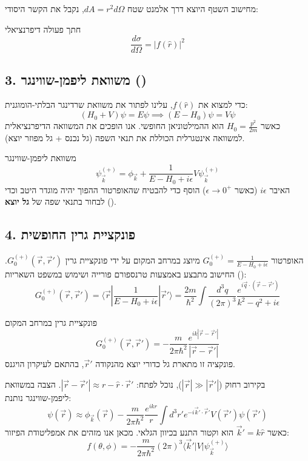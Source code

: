 מחישוב השטף היוצא דרך אלמנט שטח $dA = r^2 d\Omega$, נקבל את הקשר היסודי:
\begin{resultbox}{חתך פעולה דיפרנציאלי}
$$\frac{d\sigma}{d\Omega} = |f(\hat{r})|^2$$
\end{resultbox}

\subsection*{3. משוואת ליפמן-שווינגר ()}
כדי למצוא את $f(\hat{r})$, עלינו לפתור את משוואת שרדינגר הבלתי-הומוגנית:
$$(H_0 + V) \psi = E \psi \implies (E - H_0) \psi = V \psi$$
כאשר $H_0 = \frac{p^2}{2m}$ הוא ההמילטוניאן החופשי. אנו הופכים את המשוואה הדיפרנציאלית למשוואה אינטגרלית הכוללת את תנאי השפה (גל נכנס + גל מפוזר יוצא).

\begin{theorembox}{משוואת ליפמן-שווינגר}
$$\psi_{\vec{k}}^{(+)} = \phi_{\vec{k}} + \frac{1}{E - H_0 + i\epsilon} V \psi_{\vec{k}}^{(+)}$$
האיבר $i\epsilon$ (כאשר $\epsilon \to 0^+$) הוסף כדי להבטיח שהאופרטור ההפוך יהיה מוגדר היטב וכדי לבחור בתנאי שפה של \textbf{גל יוצא} ().
\end{theorembox}

\subsection*{4. פונקציית גרין החופשית}
האופרטור $G_0^{(+)} = \frac{1}{E - H_0 + i\epsilon}$ מיוצג במרחב המקום על ידי פונקציית גרין $G_0^{(+)}(\vec{r}, \vec{r}')$. 
החישוב מתבצע באמצעות טרנספורם פורייה ושימוש במשפט השאריות ():
$$G_0^{(+)}(\vec{r}, \vec{r}') = \langle \vec{r} | \frac{1}{E - H_0 + i\epsilon} | \vec{r}' \rangle = \frac{2m}{\hbar^2} \int \frac{d^3q}{(2\pi)^3} \frac{e^{i\vec{q}\cdot(\vec{r}-\vec{r}')}}{k^2 - q^2 + i\epsilon}$$

\begin{resultbox}{פונקציית גרין במרחב המקום}
$$G_0^{(+)}(\vec{r}, \vec{r}') = -\frac{m}{2\pi \hbar^2} \frac{e^{ik|\vec{r}-\vec{r}'|}}{|\vec{r}-\vec{r}'|}$$
פונקציה זו מתארת גל כדורי יוצא מהנקודה $\vec{r}'$, בהתאם לעיקרון הויגנס.
\end{resultbox}

בקירוב רחוק ($|\vec{r}| \gg |\vec{r}'|$), נוכל לפתח:
$|\vec{r} - \vec{r}'| \approx r - \hat{r}\cdot\vec{r}'$.
הצבה במשוואת ליפמן-שווינגר נותנת:
$$\psi(\vec{r}) \approx \phi_{\vec{k}}(\vec{r}) - \frac{m}{2\pi \hbar^2} \frac{e^{ikr}}{r} \int d^3r' e^{-i\vec{k}'\cdot\vec{r}'} V(\vec{r}') \psi(\vec{r}')$$
כאשר $\vec{k}' = k\hat{r}$ הוא וקטור התנע בכיוון הגלאי. מכאן אנו מזהים את אמפליטודת הפיזור:
$$f(\theta, \phi) = -\frac{m}{2\pi \hbar^2} (2\pi)^3 \langle \vec{k}' | V | \psi_{\vec{k}}^{(+)} \rangle$$

